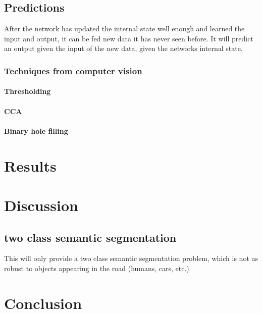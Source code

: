 \documentclass[USenglish]{ifimaster}  %
\begin{document}
\section{Predictions}
After the network has updated the internal state well enough and learned the input and output, it can be fed new data it has never seen before. It will predict an output given the input of the new data, given the networks internal state.  
\subsection{Techniques from computer vision}
\subsubsection{Thresholding}
\subsubsection{CCA}
\subsubsection{Binary hole filling}

\chapter{Results}                     

\chapter{Discussion}
\section{two class semantic segmentation}
This will only provide a two class semantic segmentation problem, which is not as robust to objects appearing in the road (humans, cars, etc.) 

\chapter{Conclusion}



\backmatter{}
\printbibliography
\end{document}
